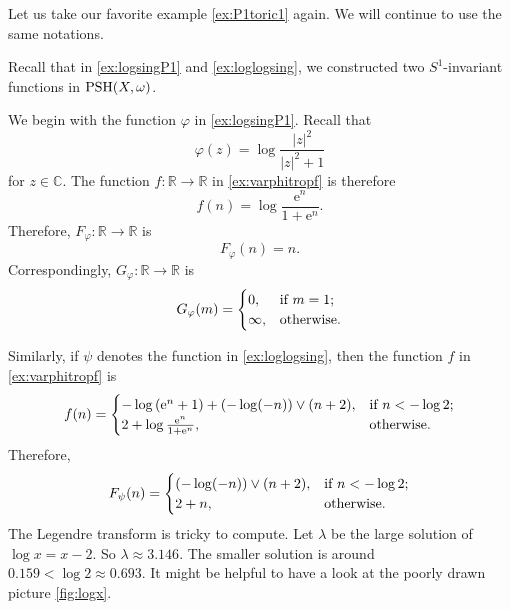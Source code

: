 \begin{example}\label{ex:FGsimplevarphi}
    Let us take our favorite example \cref{ex:P1toric1} again. We will continue to use the same notations.

    Recall that in \cref{ex:logsingP1} and \cref{ex:loglogsing}, we constructed two $S^1$-invariant functions in $\mathrm{PSH}(X,\omega)$.

    We begin with the function $\varphi$ in \cref{ex:logsingP1}. Recall that
    \[
    \varphi(z)=\log \frac{|z|^2}{|z|^2+1}
    \]
    for $z\in \mathbb{C}$. The function $f\colon \mathbb{R}\rightarrow \mathbb{R}$ in \eqref{ex:varphitropf} is therefore
    \[
    f(n)=\log \frac{\mathrm{e}^{n}}{1+\mathrm{e}^{n}}.
    \]
    Therefore, $F_{\varphi}\colon \mathbb{R}\rightarrow \mathbb{R}$ is
    \[
    F_{\varphi}(n)=n.
    \]
    Correspondingly, $G_{\varphi}\colon \mathbb{R}\rightarrow \mathbb{R}$ is
    \[
    G_{\varphi}(m)=
    \begin{cases}
        0,&\textup{if } m=1;\\
        \infty,&\textup{otherwise}.
    \end{cases}
    \]

    Similarly, if $\psi$ denotes the function in \cref{ex:loglogsing}, then the function $f$ in \eqref{ex:varphitropf} is
    \[
    f(n)=
    \begin{cases}
        -\log \left(\mathrm{e}^n+1 \right)+(-\log (-n))\lor (n+2),&\textup{if } n<-\log 2;\\
        2+\log \frac{\mathrm{e}^{n}}{1+\mathrm{e}^{n}},&\textup{otherwise}.
    \end{cases}
    \]
    Therefore,
    \[
    F_{\psi}(n)=
    \begin{cases}
        (-\log (-n))\lor (n+2),&\textup{if } n<-\log 2;\\
        2+n,&\textup{otherwise}.
    \end{cases}
    \]
    The Legendre transform is tricky to compute. Let $\lambda$ be the large solution of $\log x=x-2$. So $\lambda\approx 3.146$. The smaller solution is around $0.159<\log 2\approx 0.693$. It might be helpful to have a look at the poorly drawn picture \cref{fig:logx}.


\end{example}
